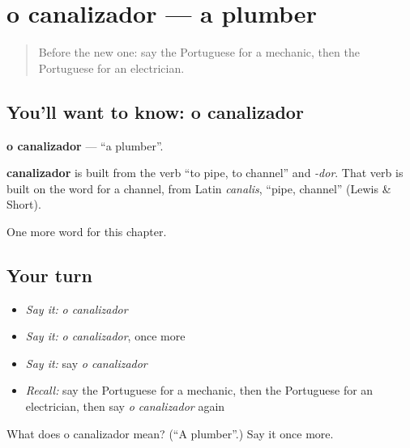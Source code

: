 \section[o canalizador]{o canalizador — a plumber}

\label{lesson:PT-C246-canalizador}



\begin{quote}
Before the new one: say the Portuguese for a mechanic, then the Portuguese for an electrician.
\end{quote}

\subsection*{You'll want to know: o canalizador}
\textbf{o canalizador} — \textquotedblleft{}a plumber\textquotedblright{}.

\begin{cousinweb}
\textbf{canalizador} is built from the verb \textquotedblleft{}to pipe, to channel\textquotedblright{} and \emph{-dor}. That verb is built on the word for a channel, from Latin \emph{canalis}, \textquotedblleft{}pipe, channel\textquotedblright{} (Lewis \& Short).
\end{cousinweb}

\begin{grammarlens}[title={What you've built}]
One more word for this chapter.
\end{grammarlens}

\subsection*{Your turn}
\begin{itemize}
\raggedright
  \item \emph{Say it:} \emph{o canalizador}
  \item \emph{Say it:} \emph{o canalizador}, once more
  \item \emph{Say it:} say \emph{o canalizador}
  \item \emph{Recall:} say the Portuguese for a mechanic, then the Portuguese for an electrician, then say \emph{o canalizador} again
\end{itemize}

\begin{tcolorbox}[breakable,colback=teal!4,colframe=teal!35!black,title={Before you move on}]
What does o canalizador mean? (\textquotedblleft{}A plumber\textquotedblright{}.) Say it once more.
\end{tcolorbox}
